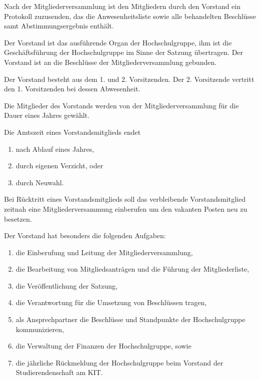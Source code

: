 \documentclass[a4paper, parskip=half, numbers=noenddot]{scrartcl}
\begin{document}
\begin{contract}
Nach der Mitgliederversammlung ist den Mitgliedern durch den Vorstand ein
Protokoll zuzusenden, das die Anwesenheitsliste sowie alle behandelten
Beschlüsse samt Abstimmungsergebnis enthält.



%
%


Der Vorstand ist das ausführende Organ der Hochschulgruppe, ihm ist die
Geschäftsführung der Hochschulgruppe im Sinne der Satzung übertragen.
Der Vorstand ist an die Beschlüsse der Mitgliederversammlung gebunden.

Der Vorstand besteht aus dem 1. und 2. Vorsitzenden.
Der 2. Vorsitzende vertritt den 1. Vorsitzenden bei dessen Abwesenheit.

Die Mitglieder des Vorstands werden von der Mitgliederversammlung für die Dauer
eines Jahres gewählt.

Die Amtszeit eines Vorstandsmitglieds endet
\begin{enumerate}
  \item nach Ablauf eines Jahres,
  \item durch eigenen Verzicht, oder
  \item durch Neuwahl.
\end{enumerate}
Bei Rücktritt eines Vorstandsmitglieds soll das verbleibende Vorstandsmitglied
zeitnah eine Mitgliederversammung einberufen um den vakanten Posten neu zu
besetzen.

Der Vorstand hat besonders die folgenden Aufgaben:
\begin{enumerate}
  \item die Einberufung und Leitung der Mitgliederversammlung,
  \item die Bearbeitung von Mitgliedsanträgen und die Führung der
    Mitgliederliste,
  \item die Veröffentlichung der Satzung,
  \item die Verantwortung für die Umsetzung von Beschlüssen tragen,
  \item als Ansprechpartner die Beschlüsse und Standpunkte der Hochschulgruppe
    kommunizieren,
  \item die Verwaltung der Finanzen der Hochschulgruppe, sowie
  \item die jährliche Rückmeldung der Hochschulgruppe beim Vorstand der
    Studierendenschaft am KIT.
\end{enumerate}


\end{contract}
\end{document}
